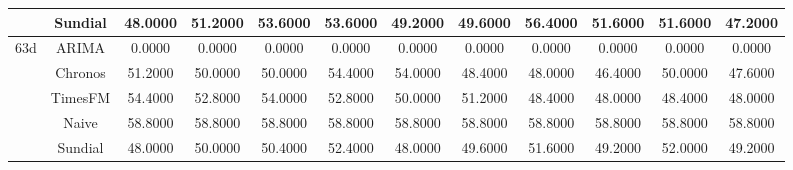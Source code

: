 \begin{table}[H]
{\begin{tabular}{cccccccccccc}
 & Sundial & 48.0000 & 51.2000 & 53.6000 & 53.6000 & 49.2000 & 49.6000 & 56.4000 & 51.6000 & 51.6000 & 47.2000 \\
\midrule
\multirow[c]{5}{*}{63d} & ARIMA & 0.0000 & 0.0000 & 0.0000 & 0.0000 & 0.0000 & 0.0000 & 0.0000 & 0.0000 & 0.0000 & 0.0000 \\
 & Chronos & 51.2000 & 50.0000 & 50.0000 & 54.4000 & 54.0000 & 48.4000 & 48.0000 & 46.4000 & 50.0000 & 47.6000 \\
 & TimesFM & 54.4000 & 52.8000 & 54.0000 & 52.8000 & 50.0000 & 51.2000 & 48.4000 & 48.0000 & 48.4000 & 48.0000 \\
 & Naive & 58.8000 & 58.8000 & 58.8000 & 58.8000 & 58.8000 & 58.8000 & 58.8000 & 58.8000 & 58.8000 & 58.8000 \\
 & Sundial & 48.0000 & 50.0000 & 50.4000 & 52.4000 & 48.0000 & 49.6000 & 51.6000 & 49.2000 & 52.0000 & 49.2000 \\
\bottomrule
\end{tabular}

 }
\end{table}